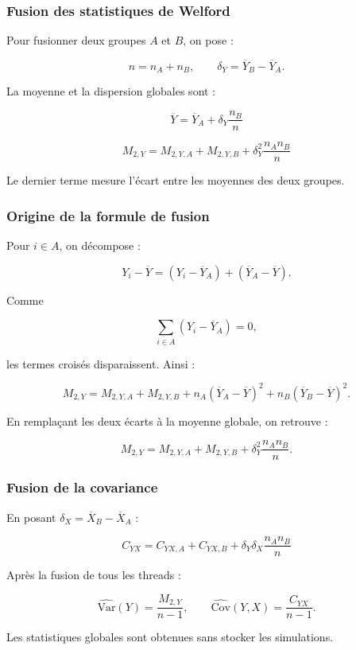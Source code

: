 \documentclass[aspectratio=169,11pt]{beamer}
\begin{document}
\begin{frame}
    \frametitle{Fusion des statistiques de Welford}

    Pour fusionner deux groupes $A$ et $B$, on pose :

    \[
        n=n_A+n_B,
        \qquad
        \delta_Y=\overline{Y}_B-\overline{Y}_A.
    \]

    La moyenne et la dispersion globales sont :

    \[
        \boxed{\overline{Y}
        =\overline{Y}_A+\delta_Y\frac{n_B}{n}}
    \]

    \[
        \boxed{M_{2,Y}
        =M_{2,Y,A}+M_{2,Y,B}
        +\delta_Y^2\frac{n_A n_B}{n}}
    \]

    Le dernier terme mesure l'écart entre les moyennes des deux groupes.
\end{frame}

\begin{frame}
    \frametitle{Origine de la formule de fusion}

    Pour $i\in A$, on décompose :

    \[
        Y_i-\overline{Y}
        =(Y_i-\overline{Y}_A)+(\overline{Y}_A-\overline{Y}).
    \]

    Comme

    \[
        \sum_{i\in A}(Y_i-\overline{Y}_A)=0,
    \]

    les termes croisés disparaissent. Ainsi :

    \[
        M_{2,Y}=M_{2,Y,A}+M_{2,Y,B}
        +n_A(\overline{Y}_A-\overline{Y})^2
        +n_B(\overline{Y}_B-\overline{Y})^2.
    \]

    En remplaçant les deux écarts à la moyenne globale, on retrouve :

    \[
        \boxed{M_{2,Y}=M_{2,Y,A}+M_{2,Y,B}
        +\delta_Y^2\frac{n_A n_B}{n}}.
    \]
\end{frame}

\begin{frame}
    \frametitle{Fusion de la covariance}

    En posant $\delta_X=\overline{X}_B-\overline{X}_A$ :

    \[
        \boxed{
        C_{YX}
        =C_{YX,A}+C_{YX,B}
        +\delta_Y\delta_X\frac{n_A n_B}{n}
        }
    \]

    Après la fusion de tous les threads :

    \[
        \widehat{\mathrm{Var}}(Y)=\frac{M_{2,Y}}{n-1},
        \qquad
        \widehat{\mathrm{Cov}}(Y,X)=\frac{C_{YX}}{n-1}.
    \]

    Les statistiques globales sont obtenues sans stocker les simulations.
\end{frame}
\end{document}
